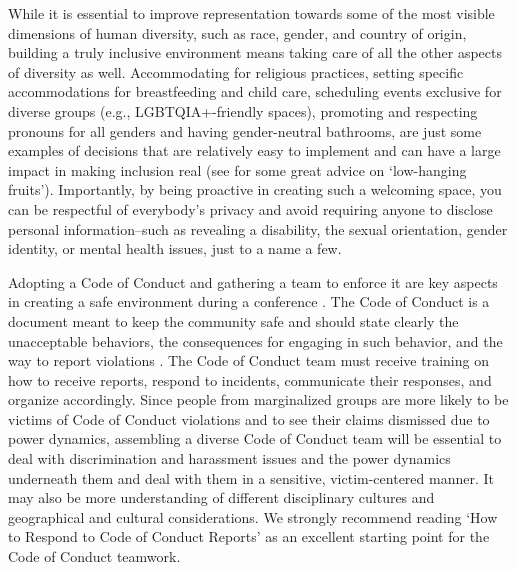 \documentclass[10pt,letterpaper]{article}
\begin{document}
While it is essential to improve representation towards some of the most visible dimensions of human diversity, such as race, gender, and country of origin, building a truly inclusive environment means taking care of all the other aspects of diversity as well. 
Accommodating for religious practices, setting specific accommodations for breastfeeding and child care, scheduling events exclusive for diverse groups (e.g., LGBTQIA+-friendly spaces), promoting and respecting pronouns for all genders and having gender-neutral bathrooms, are just some examples of decisions that are relatively easy to implement and can have a large impact in making inclusion real (see \cite{noauthor_discover2021} for some great advice on `low-hanging fruits').
Importantly, by being proactive in creating such a welcoming space, you can be respectful of everybody's privacy and avoid requiring anyone to disclose personal information–such as revealing a disability, the sexual orientation, gender identity, or mental health issues, just to a name a few.

Adopting a Code of Conduct and gathering a team to enforce it are key aspects in creating a safe environment during a conference \cite{favaroYourScienceConference2016}.
The Code of Conduct is a document meant to keep the community safe and should state clearly the unacceptable behaviors, the consequences for engaging in such behavior, and the way to report violations \cite{auroraHowRespondCode2019}. 
The Code of Conduct team must receive training on how to receive reports, respond to incidents, communicate their responses, and organize accordingly. 
Since people from marginalized groups are more likely to be victims of Code of Conduct violations and to see their claims dismissed due to power dynamics, assembling a diverse Code of Conduct team will be essential to deal with discrimination and harassment issues and the power dynamics underneath them and deal with them in a sensitive, victim-centered manner. It may also be more understanding of different disciplinary cultures and geographical and cultural considerations. 
We strongly recommend reading `How to Respond to Code of Conduct Reports' \cite{auroraHowRespondCode2019} as an excellent starting point for the Code of Conduct teamwork.

\end{document}
